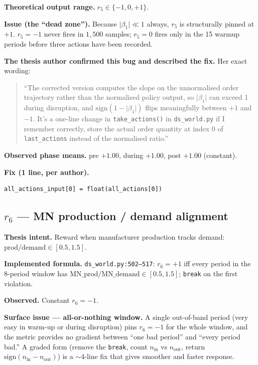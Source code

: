 \documentclass[11pt,letterpaper]{article}
\newcommand{\code}[1]{\texttt{\small #1}}
\begin{document}
\textbf{Theoretical output range.}  $r_5 \in \{-1, 0, +1\}$.

\textbf{Issue (the ``dead zone'').}  Because $\lvert \beta_1 \rvert \ll 1$ always, $r_5$ is structurally pinned at $+1$.  $r_5 = -1$ never fires in $1{,}500$ samples; $r_5 = 0$ fires only in the 15 warmup periods before three actions have been recorded.

\textbf{The thesis author confirmed this bug and described the fix.}  Her exact wording:
\begin{quote}
``The corrected version computes the slope on the unnormalised order trajectory rather than the normalised policy output, so $\lvert\beta_1\rvert$ can exceed 1 during disruption, and $\mathrm{sign}(1-\lvert\beta_1\rvert)$ flips meaningfully between $+1$ and $-1$.  It's a one-line change in \code{take\_actions()} in \code{ds\_world.py} if I remember correctly, store the actual order quantity at index 0 of \code{last\_actions} instead of the normalised ratio.''
\end{quote}

\textbf{Observed phase means.}  pre $+1.00$, during $+1.00$, post $+1.00$ (constant).

\textbf{Fix (1 line, per author).}
\begin{lstlisting}
all_actions_input[0] = float(all_actions[0])
\end{lstlisting}

\subsection{$r_6$ --- MN production / demand alignment}

\textbf{Thesis intent.}  Reward when manufacturer production tracks demand: $\text{prod}/\text{demand} \in [0.5, 1.5]$.

\textbf{Implemented formula.}  \code{ds\_world.py:502--517}: $r_6 = +1$ iff every period in the 8-period window has $\text{MN\_prod}/\text{MN\_demand} \in [0.5, 1.5]$; \code{break} on the first violation.

\textbf{Observed.}  Constant $r_6 = -1$.

\textbf{Surface issue --- all-or-nothing window.}  A single out-of-band period (very easy in warm-up or during disruption) pins $r_6 = -1$ for the whole window, and the metric provides no gradient between ``one bad period'' and ``every period bad.''  A graded form (remove the \code{break}, count $n_{\text{in}}$ vs $n_{\text{out}}$, return $\mathrm{sign}(n_{\text{in}}-n_{\text{out}})$) is a $\sim$4-line fix that gives smoother and faster response.
\end{document}
